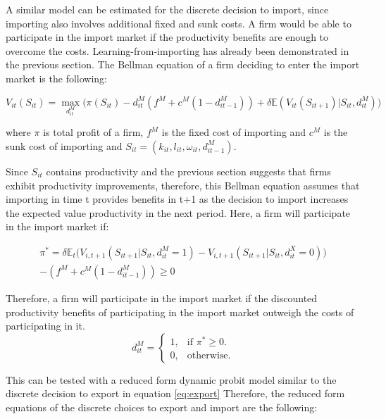 \documentclass[12pt]{article}
\begin{document}
A similar model can be estimated for the discrete decision to import,
since importing also involves additional fixed and sunk costs. A firm
would be able to participate in the import market if the productivity
benefits are enough to overcome the costs. Learning-from-importing has already been
demonstrated in the previous section. The Bellman equation of a firm
deciding to enter the import market is the following: 

\begin{equation}
V_{it}(S_{it})=  \underset{d_{it}^{M}}{\max}\Big(\pi(S_{it}) - d_{it}^{M}( f^{M} +
c^{M}(1-d_{it-1}^{M}))  + \delta \mathbb{E} (V_{it}(S_{it+1})|S_{it}, d_{it}^{M})\Big)
\end{equation}

where $\pi$ is total profit of a firm, $f^{M}$ is the fixed cost of
importing and  $c^{M}$ is the sunk cost of importing and  $S_{it} = (k_{it}, l_{it}, \omega_{it},
d_{it-1}^{M})$. 

Since $S_{it}$ contains productivity and the previous section suggests
that firms exhibit productivity improvements,  therefore,  this Bellman equation assumes that
importing in time t provides benefits in t+1 as the decision to
import increases the expected value productivity in the next period. Here, a firm will participate in the
import market if:

\begin{equation}
\begin{aligned}
\pi^{*}= 
\delta \mathbb{E}_{t}\Big(V_{i,t+1}(S_{it+1}|S_{it},d_{it}^{M}=1) -
V_{i,t+1}(S_{it+1}|S_{it},d_{it}^{X}=0) \Big) \\-  
(f^{M} + c^{M}(1-d_{it-1}^{M})) \geq 0
\end{aligned}
\end{equation}

Therefore, a firm will participate in the import market if the
discounted productivity benefits of participating in the
import market outweigh the costs of participating in it.
\begin{equation}
  d_{it}^{M}=\begin{cases}
   1 , & \text{if $\pi^{*} \geq 0 $}.\\
   0 , & \text{otherwise}.
  \end{cases}
\end{equation}


This can be tested with a reduced form dynamic probit model similar to
the discrete decision to export in equation \ref{eq:export}  Therefore, the reduced form equations of
the discrete choices to export and import are the following:
\end{document}
